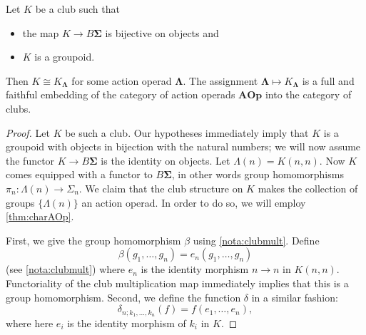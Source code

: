 \documentclass{amsbook} %
\newcommand{\mb}{\mathbf}
\numberwithin{section}{chapter}
\begin{document}
\begin{thm}\label{thm:club=operad}
Let $K$ be a club such that
\begin{itemize}
\item the map $K \rightarrow B \mb{\Sigma}$ is bijective on objects and
\item $K$ is a groupoid.
\end{itemize}
Then $K \cong K_{\mb{\Lambda}}$ for some action operad $\mb{\Lambda}$.  The assignment $\mb{\Lambda} \mapsto K_{\mb{\Lambda}}$ is a full and faithful embedding of the category of action operads $\mb{AOp}$ into the category of clubs.
\end{thm}
\begin{proof}
Let $K$ be such a club.  Our hypotheses immediately imply that $K$ is a groupoid with objects in bijection with the natural numbers; we will now assume the functor $K \to B\mb{\Sigma}$ is the identity on objects.  Let $\Lambda(n) = K(n,n)$.  Now $K$ comes equipped with a functor to $B \mb{\Sigma}$, in other words group homomorphisms $\pi_{n}:\Lambda(n) \rightarrow \Sigma_{n}$.  We claim that the club structure on $K$ makes the collection of groups $\{ \Lambda(n) \}$ an action operad.  In order to do so, we will employ \cref{thm:charAOp}.

First, we give the group homomorphism $\beta$ using \cref{nota:clubmult}.  Define 
\[
\beta(g_{1}, \ldots, g_{n}) = e_{n}(g_{1}, \ldots, g_{n})
\]
 (see \ref{nota:clubmult}) where $e_{n}$ is the identity morphism $n \to n$ in $K(n,n)$.  Functoriality of the club multiplication map immediately implies that this is a group homomorphism.  Second, we define the function $\delta$ in a similar fashion:
\[
\delta_{n; k_{1}, \ldots, k_{n}}(f) = f(e_{1}, \ldots, e_{n}),
\]
where here $e_{i}$ is the identity morphism of $k_{i}$ in $K$.



\end{proof}
\end{document}
